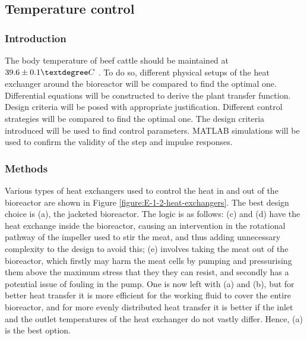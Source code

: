 \vspace{-10mm}
\subsection{Temperature control}
\vspace{-3mm}
\subsubsection{Introduction}


The body temperature of beef cattle should be maintained at $39.6 \pm 0.1 \textdegree C$ \cite{E-Gaughan2014}. To do so, different physical setups of the heat exchanger around the bioreactor will be compared to find the optimal one. Differential equations will be constructed to derive the plant transfer function. Design criteria will be posed with appropriate justification. Different control strategies will be compared to find the optimal one. The design criteria introduced will be used to find control parameters. MATLAB simulations will be used to confirm the validity of the step and impulse responses.

\subsubsection{Methods}


Various types of heat exchangers used to control the heat in and out of the bioreactor are shown in Figure \ref{figure:E-1-2-heat-exchangers}. The best design choice is (a), the jacketed bioreactor. The logic is as follows: (c) and (d) have the heat exchange inside the bioreactor, causing an intervention in the rotational pathway of the impeller used to stir the meat, and thus adding unnecessary complexity to the design to avoid this; (e) involves taking the meat out of the bioreactor, which firstly may harm the meat cells by pumping and pressurising them above the maximum stress that they they can resist, and secondly has a potential issue of fouling in the pump. One is now left with (a) and (b), but for better heat transfer it is more efficient for the working fluid to cover the entire bioreactor, and for more evenly distributed heat transfer it is better if the inlet and the outlet temperatures of the heat exchanger do not vastly differ. Hence, (a) is the best option.

